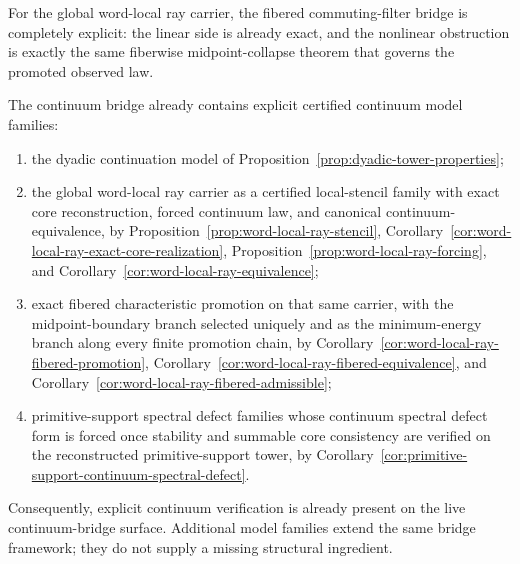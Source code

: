 \begin{remark}
\label{rem:word-local-ray-fibered-filter}
For the global word-local ray carrier, the fibered commuting-filter bridge is
completely explicit: the linear side is already exact, and the nonlinear
obstruction is exactly the same fiberwise midpoint-collapse theorem that
governs the promoted observed law.
\end{remark}

\begin{theorem}
\label{thm:explicit-continuum-verification-package}
The continuum bridge already contains explicit certified continuum model
families:
\begin{enumerate}[label=(\roman*), leftmargin=2em, itemsep=0.2em]
\item the dyadic continuation model of
      Proposition~\ref{prop:dyadic-tower-properties};
\item the global word-local ray carrier as a certified local-stencil family
      with exact core reconstruction, forced continuum law, and canonical
      continuum-equivalence, by
      Proposition~\ref{prop:word-local-ray-stencil},
      Corollary~\ref{cor:word-local-ray-exact-core-realization},
      Proposition~\ref{prop:word-local-ray-forcing}, and
      Corollary~\ref{cor:word-local-ray-equivalence};
\item exact fibered characteristic promotion on that same carrier, with the
      midpoint-boundary branch selected uniquely and as the minimum-energy
      branch along every finite promotion chain, by
      Corollary~\ref{cor:word-local-ray-fibered-promotion},
      Corollary~\ref{cor:word-local-ray-fibered-equivalence}, and
      Corollary~\ref{cor:word-local-ray-fibered-admissible};
\item primitive-support spectral defect families whose continuum spectral
      defect form is forced once stability and summable core consistency are
      verified on the reconstructed primitive-support tower,
      by Corollary~\ref{cor:primitive-support-continuum-spectral-defect}.
\end{enumerate}
Consequently, explicit continuum verification is already present on the live
continuum-bridge surface. Additional model families extend the same bridge framework;
they do not supply a missing structural ingredient.
\end{theorem}

